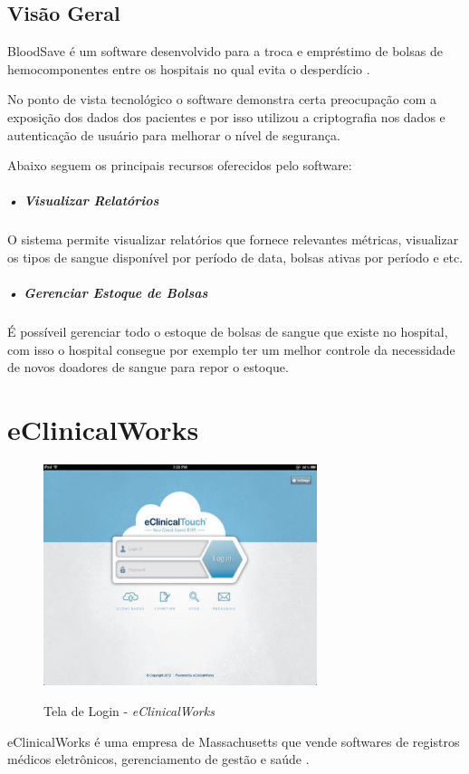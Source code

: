 \documentclass[portuguese,oneside]{tcc}
\begin{document}
\subsection{Visão Geral}
BloodSave é um software desenvolvido para a troca e empréstimo de bolsas de hemocomponentes entre os hospitais no qual evita o desperdício \cite{SANGUE}.
 
No ponto de vista tecnológico o software demonstra certa preocupação com a exposição dos dados dos pacientes e por isso utilizou a criptografia nos dados e autenticação de usuário para melhorar o nível de segurança.

Abaixo seguem os principais recursos oferecidos pelo software:

\subparagraph{• Visualizar Relatórios}
O sistema permite visualizar relatórios que fornece relevantes métricas, visualizar os tipos de sangue disponível por período de data, bolsas ativas por período e etc\cite{SANGUE}.

\subparagraph{• Gerenciar Estoque de Bolsas}
É possíveil gerenciar todo o estoque de bolsas de sangue que existe no hospital, com isso o hospital consegue por exemplo ter um melhor controle da necessidade de novos doadores de sangue para repor o estoque. 


\section{eClinicalWorks}

\begin{figure}[htp]
\centering
\caption{Tela de Login - \textit{eClinicalWorks}}
\includegraphics[width=8cm]{eclinicalworks}
\label{fig:eclinicalworks}
\end{figure}

eClinicalWorks é uma empresa de Massachusetts que vende softwares de registros médicos eletrônicos, gerenciamento de gestão e saúde \cite{ECLINICAL}.
 
\end{document}
